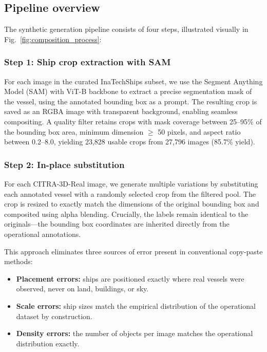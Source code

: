 \documentclass[a4paper,fleqn]{cas-dc}
\begin{document}
\subsection{Pipeline overview}\label{sec:pipeline}

The synthetic generation pipeline consists of four steps, illustrated visually in Fig.~\ref{fig:composition_process}:

\subsubsection{Step 1: Ship crop extraction with SAM}

For each image in the curated InaTechShips subset, we use the Segment Anything Model (SAM) \citep{kirillov2023segment} with ViT-B backbone to extract a precise segmentation mask of the vessel, using the annotated bounding box as a prompt. The resulting crop is saved as an RGBA image with transparent background, enabling seamless compositing. A quality filter retains crops with mask coverage between 25--95\% of the bounding box area, minimum dimension $\geq$ 50 pixels, and aspect ratio between 0.2--8.0, yielding 23,828 usable crops from 27,796 images (85.7\% yield).

\subsubsection{Step 2: In-place substitution}

For each CITRA-3D-Real image, we generate multiple variations by substituting each annotated vessel with a randomly selected crop from the filtered pool. The crop is resized to exactly match the dimensions of the original bounding box and composited using alpha blending. Crucially, the labels remain identical to the originals---the bounding box coordinates are inherited directly from the operational annotations.

This approach eliminates three sources of error present in conventional copy-paste methods:
\begin{itemize}
    \item \textbf{Placement errors:} ships are positioned exactly where real vessels were observed, never on land, buildings, or sky.
    \item \textbf{Scale errors:} ship sizes match the empirical distribution of the operational dataset by construction.
    \item \textbf{Density errors:} the number of objects per image matches the operational distribution exactly.
\end{itemize}
\end{document}
